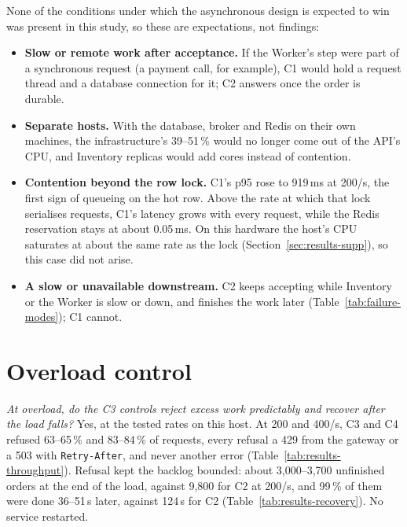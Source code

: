 \documentclass[a4paper]{report}
\begin{document}
None of the conditions under which the asynchronous design is expected to win
was present in this study, so these are expectations, not findings:
\begin{itemize}
  \item \textbf{Slow or remote work after acceptance.} If the Worker's step
    were part of a synchronous request (a payment call, for example), C1 would
    hold a request thread and a database connection for it; C2 answers once
    the order is durable.
  \item \textbf{Separate hosts.} With the database, broker and Redis on their
    own machines, the infrastructure's 39--51\,\% would no longer come out of
    the API's CPU, and Inventory replicas would add cores instead of contention.
  \item \textbf{Contention beyond the row lock.} C1's p95 rose to 919\,ms at
    200/s, the first sign of queueing on the hot row. Above the rate at which
    that lock serialises requests, C1's latency grows with every request,
    while the Redis reservation stays at about 0.05\,ms. On this hardware the
    host's CPU saturates at about the same rate as the lock
    (Section~\ref{sec:results-supp}), so this case did not arise.
  \item \textbf{A slow or unavailable downstream.} C2 keeps accepting while
    Inventory or the Worker is slow or down, and finishes the work later
    (Table~\ref{tab:failure-modes}); C1 cannot.
\end{itemize}

\section{Overload control}
\label{sec:dis-overload}

\emph{At overload, do the C3 controls reject excess work predictably and
recover after the load falls?} Yes, at the tested rates on this host. At 200
and 400/s, C3 and C4 refused 63--65\,\% and 83--84\,\% of requests, every
refusal a 429 from the gateway or a 503 with \texttt{Retry-After}, and never
another error (Table~\ref{tab:results-throughput}).
Refusal kept the backlog bounded: about 3,000--3,700 unfinished orders at the
end of the load, against 9,800 for C2 at 200/s, and 99\,\% of them were done
36--51\,s later, against 124\,s for C2 (Table~\ref{tab:results-recovery}). No
service restarted.
\end{document}
